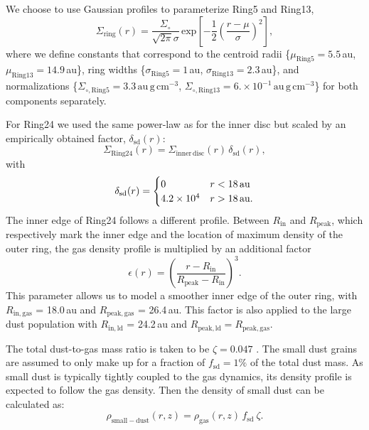 \documentclass[fleqn,usenatbib,useAMS]{mnras}
\begin{document}
We choose to use Gaussian profiles to parameterize Ring5 and Ring13,
\begin{equation}
  \Sigma_{\mathrm{ring}}(r) = \frac{\Sigma_\circ}{\sqrt{2 \pi} \sigma}
  \, \mathrm{exp}\left[-\frac{1}{2}\left(\frac{r-\mu}{\sigma}\right)^{2}\right],
\end{equation}
where we define constants that correspond to the centroid radii \{$\mu_{\mathrm{Ring5}}=5.5$\,au, $\mu_{\mathrm{Ring13}}=14.9$\,au\}, ring widths \{$\sigma_{\mathrm{Ring5}}=1$\,au, $\sigma_{\mathrm{Ring13}}=2.3$\,au\}, and normalizations \{$\Sigma_{\circ,\mathrm{Ring5}}=3.3$\,$\mathrm{au\,g\,cm^{-3}}$, $\Sigma_{\circ,\mathrm{Ring13}}=6. \times 10^{-1}$\,$\mathrm{au\,g\,cm^{-3}}$\} for both components separately.

For Ring24 we used the same power-law as for the inner disc but scaled by an empirically obtained factor, $\delta_{\mathrm{sd}}(r)$:
\begin{equation}
  \Sigma_{\mathrm{Ring24}}(r) = \Sigma_{\mathrm{inner\,disc}}(r)\, \delta_{\mathrm{sd}}(r),
\end{equation}
with
\begin{equation}
  \delta_{\mathrm{sd}}(r) =
  \begin{cases}
  0    & r < 18\text{\,au} \\
  4.2\times 10^4 & r > 18\text{\,au}.
  \end{cases}
\end{equation}
The inner edge of Ring24 follows a different profile. Between $R_\mathrm{in}$ and $R_\mathrm{peak}$, which respectively mark  the inner edge and the location of maximum density of the outer ring, the gas density profile is multiplied by an additional factor
\begin{equation}
    \epsilon(r) = \left(\frac{ r - R_\mathrm{in}}{R_\mathrm{peak} - R_\mathrm{in}}\right)^3.
\end{equation}
This parameter allows us to model a smoother inner edge of the outer ring, with $R_\mathrm{in,gas}$ = 18.0\,au and $R_\mathrm{peak,gas}$ = 26.4\,au. This factor is also applied to the large dust population with $R_\mathrm{in,ld}$ = 24.2\,au and $R_\mathrm{peak,ld} = R_\mathrm{peak,gas}$. 

The total dust-to-gas mass ratio is taken to be $\zeta = 0.047$ \citep[as in][]{Rosenfeld_2013}. The small dust grains are assumed to only make up for a fraction of $f_\mathrm{sd}=1\%$ of the total dust mass. As small dust is typically tightly coupled to the gas dynamics, its density profile is expected to follow the gas density. Then the density of small dust can be calculated as:
\begin{equation}
\rho_{\mathrm{small-dust}}(r,z)=\rho_{\mathrm{gas}}(r,z)\, f_{\mathrm{sd}} \: \zeta .
\end{equation}
\end{document}
